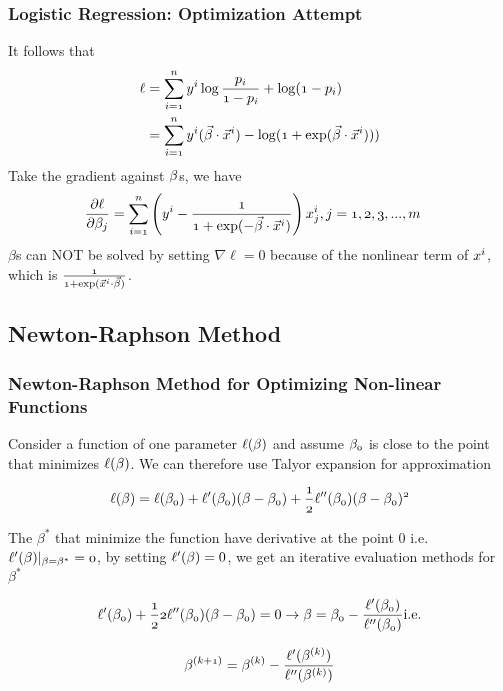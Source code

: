 \documentclass[notheorems, aspectratio=54]{beamer}
\begin{document}
\begin{frame}

\frametitle{Logistic Regression: Optimization Attempt}
It follows that
\begin{align*}
\mathnormal{\ell}&=\mathnormal{\sum_{i=1}^{n}y^i\log\frac{p_i}{1-p_i}+\log(1-p_i)}\\
&=\mathnormal{\sum_{i=1}^{n}y^i(\vec{\beta}\cdot\vec{x}^i)-\log(1+\exp(\vec{\beta}\cdot\vec{x}^i)))}
\end{align*}
Take the gradient against $\mathnormal{\beta}$s, we have
\begin{align*}
\mathnormal{\frac{\partial\ell}{\partial\beta_j}}
&=\mathnormal{\sum_{i=1}^{n}\left (y^i-\frac{1}{1+\exp(-\vec{\beta}\cdot\vec{x}^i)} \right) x_{j}^{i}}, \mathnormal{j=1, 2, 3, ...,m}
\end{align*}
$\beta$s can NOT be solved by setting $\nabla\ell=0$ because of the nonlinear term of $\mathnormal{x^i}$, which is $\mathnormal{\frac{1}{1+\exp(\vec{x}^i\cdot\vec{\beta})}}$.
\end{frame}

\begin{frame}

\subsection{Newton-Raphson Method}

\frametitle{Newton-Raphson Method for Optimizing Non-linear Functions}
Consider a function of one parameter $\mathnormal{\ell(\beta)}$ and assume $\mathnormal{\beta_0}$ is close to the point that minimizes $\mathnormal{\ell(\beta)}$. We can therefore use Talyor expansion for approximation

$$
\mathnormal{\ell(\beta)=\ell(\beta_0)+\ell'(\beta_0)(\beta-\beta_0)+\frac{1}{2}\ell''(\beta_0)(\beta-\beta_0)^2}
$$

The $\beta^*$ that minimize the function have derivative at the point 0 i.e. $\mathnormal{\ell'(\beta)|_{\beta=\beta^*}=0}$, by setting $\mathnormal{\ell'(\beta)}=0$, we get an iterative evaluation methods for $\beta^*$

$$
\mathnormal{\ell'(\beta_0)+\frac{1}{2}2\ell''(\beta_0)(\beta-\beta_0)}=0
\rightarrow
\mathnormal{\beta=\beta_0-\frac{\ell'(\beta_0)}{\ell''(\beta_0)}} \text{i.e.}
$$

$$
\mathnormal{\beta^{(k+1)}=\beta^{(k)}-\frac{\ell'(\beta^{(k)})}{\ell''(\beta^{(k)})}}
$$
\end{frame}
\end{document}
